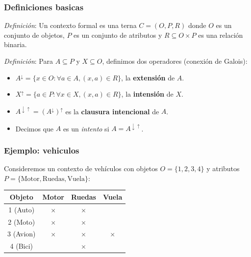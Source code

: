 \documentclass{beamer}
\begin{document}
  \begin{frame}
    \frametitle{Definiciones basicas}
    \textit{Definición}: Un contexto formal es
    una terna $C = (O, P, R)$ donde $O$ es un
    conjunto de objetos, $P$ es un conjunto
    de atributos y $R \subseteq O \times P$
    es una relación binaria.

    \bigskip
    \pause

    \textit{Definición}: Para $A \subseteq P$ y $X\subseteq O$,
    definimos dos operadores (conexión de Galois):

    \pause
    \begin{itemize}[<+->]
      \item $A^\downarrow = \{x \in O : \forall a \in A,
        (x,a) \in R\}$, la \textbf{extensión} de $A$.
      \item $X^\uparrow = \{a \in P : \forall x \in X,
        (x,a) \in R\}$, la \textbf{intensión} de $X$.
      \item $A^{\downarrow\uparrow} = (A^\downarrow)^\uparrow$
        es la \textbf{clausura intencional} de $A$.
      \item Decimos que $A$ es un \textit{intento}
        si $A = A^{\downarrow\uparrow}$.
    \end{itemize}
  \end{frame}

  \begin{frame}
    \frametitle{Ejemplo: vehiculos}
    Consideremos un contexto de vehículos con
    objetos $O = \{1, 2, 3, 4\}$ y atributos
    $P = \{\text{Motor}, \text{Ruedas}, \text{Vuela}\}$:

    \bigskip
    \pause

    \begin{center}
      \small
      \begin{tabular}{|c|c|c|c|}
        \hline
        \textbf{Objeto} & \textbf{Motor} &
        \textbf{Ruedas} & \textbf{Vuela} \\ \hline
        1 (Auto) & $\times$ & $\times$ & \\ \hline
        2 (Moto) & $\times$ & $\times$ & \\ \hline
        3 (Avion) & $\times$ & $\times$ & $\times$ \\ \hline
        4 (Bici) & & $\times$ & \\ \hline
      \end{tabular}
    \end{center}
  \end{frame}
\end{document}
